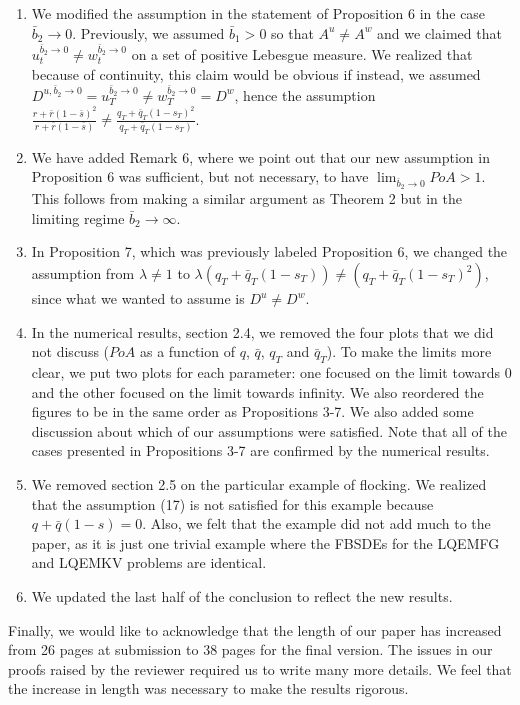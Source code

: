 \documentclass[11pt]{article}
\begin{document}
\begin{enumerate}
	\item We modified the assumption in the statement of Proposition 6 in the case $\bar{b}_2 \to 0$. Previously, we assumed $\bar{b}_1>0$ so that $A^u \neq A^w$ and we claimed that $u_t^{\bar{b}_2 \to 0}\neq w_t^{\bar{b}_2 \to 0}$ on a set of positive Lebesgue measure. We realized that because of continuity, this claim would be obvious if instead, we assumed $D^{u,\bar{b}_2 \to 0}=u_T^{\bar{b}_2 \to 0}\neq w_T^{\bar{b}_2 \to 0}=D^w$, hence the assumption $\frac{r + \bar{r}(1- \bar{s})^2}{r + \bar{r}(1-\bar{s})} \neq \frac{q_T+\bar{q}_T(1-s_T)^2}{q_T+\bar{q}_T(1-s_T)}$.
	\item We have added Remark 6, where we point out that our new assumption in Proposition 6 was sufficient, but not necessary, to have $\lim_{\bar{b}_2 \to 0}PoA>1$. This follows from making a similar argument as Theorem 2 but in the limiting regime $\bar{b}_2 \to \infty$.
	\item In Proposition 7, which was previously labeled Proposition 6, we changed the assumption from $\lambda \neq 1$ to $\lambda (q_T+\bar{q}_T(1-s_T))\neq(q_T+\bar{q}_T(1-s_T)^2)$, since what we wanted to assume is $D^u \neq D^w$.
	\item In the numerical results, section 2.4, we removed the four plots that we did not discuss ($PoA$ as a function of $q$, $\bar{q}$, $q_T$ and $\bar{q}_T$). To make the limits more clear, we put two plots for each parameter: one focused on the limit towards 0 and the other focused on the limit towards infinity. We also reordered the figures to be in the same order as Propositions 3-7. We also added some discussion about which of our assumptions were satisfied. Note that all of the cases presented in Propositions 3-7 are confirmed by the numerical results.
	\item We removed section 2.5 on the particular example of flocking. We realized that the assumption (17) is not satisfied for this example because $q+\bar{q}(1-s)=0$. Also, we felt that the example did not add much to the paper, as it is just one trivial example where the FBSDEs for the LQEMFG and LQEMKV problems are identical.
	\item We updated the last half of the conclusion to reflect the new results.
	
\end{enumerate}

Finally, we would like to acknowledge that the length of our paper has increased from 26 pages at submission to 38 pages for the final version. The issues in our proofs raised by the reviewer required us to write many more details. We feel that the increase in length was necessary to make the results rigorous.
\end{document}
